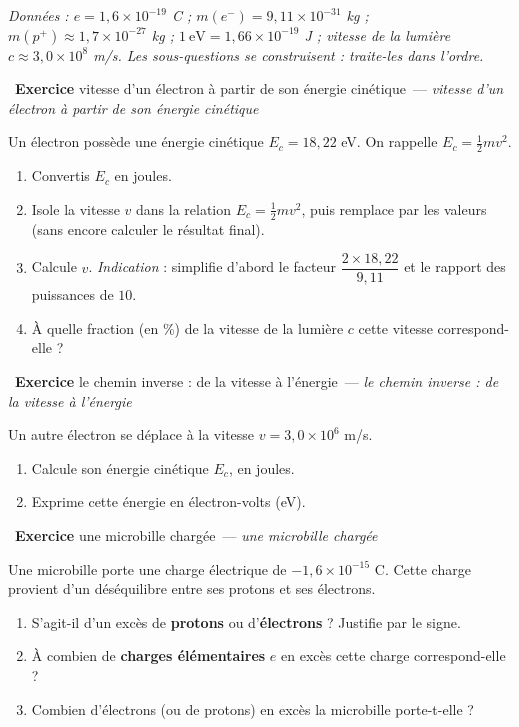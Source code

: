 \documentclass[11pt,a4paper]{article}
\newcommand{\pp}{p^{+}}
\newcommand{\ee}{e^{-}}
\newcounter{exo}
\newcommand{\exo}[1][]{\stepcounter{exo}\par\medskip%
  \noindent{\color{primary}\rule[-2pt]{3.5pt}{15pt}}\ \textbf{\color{primarydark}\large Exercice \theexo}%
  \ifx\relax#1\relax\relax\else\ \textmd{\normalsize\color{black!65}— \itshape #1}\fi\par\nopagebreak\smallskip}
\begin{document}

\vspace{3pt}
{\small\itshape Données : $e = 1{,}6\times10^{-19}$ C ; $m(\ee) = 9{,}11\times10^{-31}$ kg ;
$m(\pp)\approx 1{,}7\times10^{-27}$ kg ; $1\ \text{eV} = 1{,}66\times10^{-19}$ J ;
vitesse de la lumière $c \approx 3{,}0\times10^{8}$ m/s. Les sous-questions se construisent : traite-les
dans l'ordre.}

\exo[vitesse d'un électron à partir de son énergie cinétique]
Un électron possède une énergie cinétique $E_c = 18{,}22$ eV. On rappelle $E_c = \tfrac12 m v^2$.
\begin{enumerate}[label=\alph*)]
  \item Convertis $E_c$ en joules.
  \item Isole la vitesse $v$ dans la relation $E_c = \tfrac12 m v^2$, puis remplace par les valeurs
        (sans encore calculer le résultat final).
  \item Calcule $v$. \emph{Indication} : simplifie d'abord le facteur $\dfrac{2\times18{,}22}{9{,}11}$
        et le rapport des puissances de $10$.
  \item À quelle fraction (en \%) de la vitesse de la lumière $c$ cette vitesse correspond-elle ?
\end{enumerate}

\exo[le chemin inverse : de la vitesse à l'énergie]
Un autre électron se déplace à la vitesse $v = 3{,}0\times10^{6}$ m/s.
\begin{enumerate}[label=\alph*)]
  \item Calcule son énergie cinétique $E_c$, en joules.
  \item Exprime cette énergie en électron-volts (eV).
\end{enumerate}

\exo[une microbille chargée]
Une microbille porte une charge électrique de $-1{,}6\times10^{-15}$ C. Cette charge provient d'un
déséquilibre entre ses protons et ses électrons.
\begin{enumerate}[label=\alph*)]
  \item S'agit-il d'un excès de \textbf{protons} ou d'\textbf{électrons} ? Justifie par le signe.
  \item À combien de \textbf{charges élémentaires} $e$ en excès cette charge correspond-elle ?
  \item Combien d'électrons (ou de protons) en excès la microbille porte-t-elle ?
\end{enumerate}
\end{document}
